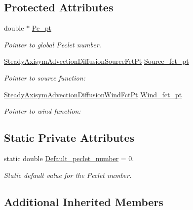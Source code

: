 \subsection*{Protected Attributes}
\begin{DoxyCompactItemize}
\item 
double $\ast$ \hyperlink{classoomph_1_1SteadyAxisymAdvectionDiffusionEquations_a8183cdef608c998b509e9f1e5e6d51e4}{Pe\+\_\+pt}
\begin{DoxyCompactList}\small\item\em Pointer to global Peclet number. \end{DoxyCompactList}\item 
\hyperlink{classoomph_1_1SteadyAxisymAdvectionDiffusionEquations_a1a8121ed2ce92dc69aa85c71975489d0}{Steady\+Axisym\+Advection\+Diffusion\+Source\+Fct\+Pt} \hyperlink{classoomph_1_1SteadyAxisymAdvectionDiffusionEquations_a13e505efbd49d7c9e5df2b4977d31956}{Source\+\_\+fct\+\_\+pt}
\begin{DoxyCompactList}\small\item\em Pointer to source function\+: \end{DoxyCompactList}\item 
\hyperlink{classoomph_1_1SteadyAxisymAdvectionDiffusionEquations_af8fad98c36589cff579a35bd32641b25}{Steady\+Axisym\+Advection\+Diffusion\+Wind\+Fct\+Pt} \hyperlink{classoomph_1_1SteadyAxisymAdvectionDiffusionEquations_a76a3b36c6873258989b7ab6d0a54503a}{Wind\+\_\+fct\+\_\+pt}
\begin{DoxyCompactList}\small\item\em Pointer to wind function\+: \end{DoxyCompactList}\end{DoxyCompactItemize}
\subsection*{Static Private Attributes}
\begin{DoxyCompactItemize}
\item 
static double \hyperlink{classoomph_1_1SteadyAxisymAdvectionDiffusionEquations_a1c0769c6f80e817010609dfa8d66c88a}{Default\+\_\+peclet\+\_\+number} = 0.
\begin{DoxyCompactList}\small\item\em Static default value for the Peclet number. \end{DoxyCompactList}\end{DoxyCompactItemize}
\subsection*{Additional Inherited Members}


